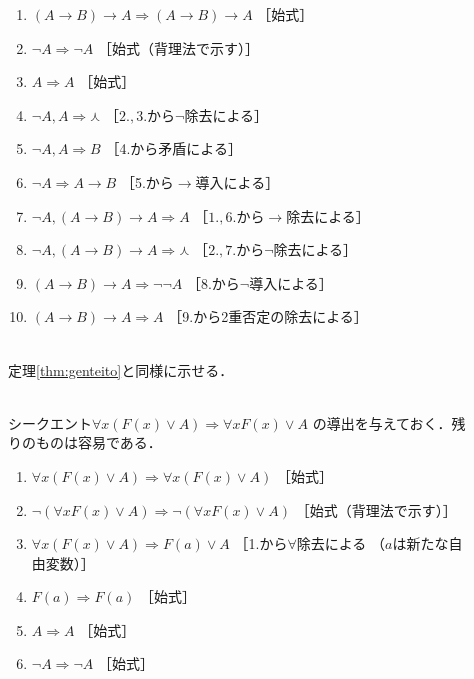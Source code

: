 \begin{description}
\item[] \mbox{}
  \begin{enumerate}[1. ]
    \item $(A \to B)  \to A \Longrightarrow (A \to B) \to A$ \quad ［始式］ 
    \item $\lnot A \Longrightarrow \lnot A$ \quad ［始式（背理法で示す）］
    \item $A \Longrightarrow A$ \quad ［始式］
    \item $\lnot A ,  A \Longrightarrow \curlywedge$ \quad ［$2., 3.$から$\lnot$除去による］
    \item $\lnot A ,  A \Longrightarrow B$ \quad ［4.から矛盾による］
    \item $\lnot A \Longrightarrow A \to B$ \quad ［5.から$\to$導入による］
    \item $\lnot A,  (A \to B) \to A \Longrightarrow A$ \quad ［$1., 6.$から$\to$除去による］ 
    \item $\lnot A,  (A \to B) \to A \Longrightarrow \curlywedge$
           \quad ［$2., 7.$から$\lnot$除去による］
    \item $(A \to B) \to A \Longrightarrow \lnot \lnot A$ \quad ［8.から$\lnot$導入による］
    \item $(A \to B) \to A \Longrightarrow A$ \quad ［9.から2重否定の除去による］
  \end{enumerate}
\item[] \mbox{} \\
  定理\ref{thm:genteito}と同様に示せる．
\item[] \mbox{} \\
  シークエント$\forall x (F(x) \lor A) \Longrightarrow \forall x F(x) \lor A$
  の導出を与えておく．残りのものは容易である．
  \begin{enumerate}[1. ]
    \item $\forall x (F(x) \lor A) \Longrightarrow 
      \forall x(F(x) \lor A) $ \quad ［始式］
    \item $\lnot ( \forall x F(x) \lor A ) 
      \Longrightarrow \lnot ( \forall x F(x) \lor A)$
      \quad ［始式（背理法で示す）］
    \item $\forall x (F(x) \lor A) \Longrightarrow 
      F(a) \lor A $ \quad ［1.から$\forall$除去による
      （$a$は新たな自由変数）］
    \item $F(a) \Longrightarrow F(a)$ \quad ［始式］
    \item $A \Longrightarrow A$ \quad ［始式］
    \item $\lnot A \Longrightarrow \lnot A$ \quad ［始式］

\end{enumerate}
\end{description}
